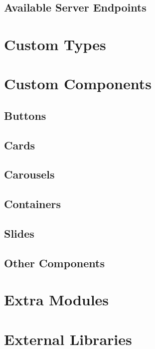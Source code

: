 \subsection{Available Server Endpoints}

\section{Custom Types}

\section{Custom Components}

\subsection{Buttons}

\subsection{Cards}

\subsection{Carousels}

\subsection{Containers}

\subsection{Slides}

\subsection{Other Components}

\section{Extra Modules}

\section{External Libraries}

